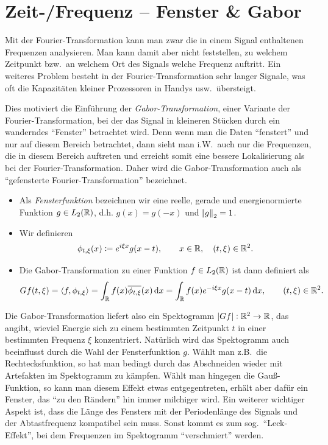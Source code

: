\section{Zeit-/Frequenz -- Fenster \& Gabor}

Mit der Fourier-Transformation kann man zwar die in einem Signal enthaltenen Frequenzen analysieren.
Man kann damit aber nicht feststellen, zu welchem Zeitpunkt bzw.\ an welchem Ort des Signals
welche Frequenz auftritt. Ein weiteres Problem besteht in der Fourier-Transformation sehr langer
Signale, was oft die Kapazitäten kleiner Prozessoren in Handys usw.\ übersteigt.

Dies motiviert die Einführung der \emph{Gabor-Transformation}, einer Variante der 
Fourier-Transformation, bei der das Signal in kleineren Stücken durch ein wanderndes 
\enquote{Fenster} betrachtet wird. Denn wenn man die Daten \enquote{fenstert} und nur auf diesem 
Bereich betrachtet, dann sieht man i.W.\ auch nur die Frequenzen, die in diesem Bereich auftreten
und erreicht somit eine bessere Lokalisierung als bei der Fourier-Transformation. Daher wird die 
Gabor-Transformation auch als \enquote{gefensterte Fourier-Transformation} bezeichnet.

\begin{definition}\leavevmode
\begin{itemize}
\item Als \emph{Fensterfunktion} bezeichnen wir eine reelle, gerade und energienormierte Funktion
  $ g \in L_{2}(\mathbb{R}) $, d.h. $ g(x) = g(-x) $ und $ \norm{g}_{2} = 1 $.
\item Wir definieren
  \[
    \phi_{t, \xi}(x) \coloneqq e^{i\xi x} g(x - t), \qquad x \in \mathbb{R}, \quad (t, \xi) \in \mathbb{R}^{2}.
  \]
\item Die Gabor-Transformation zu einer Funktion $ f \in L_{2}(\mathbb{R}) $ ist dann definiert als
  \[
      Gf(t,\xi)
    = \langle f, \phi_{t,\xi} \rangle
    = \int_{\R} f(x) \overline{\phi_{t, \xi}}(x) \dif x
    = \int_{\R} f(x) e^{-i \xi x} g(x - t) \dif x,
      \qquad (t, \xi) \in \R^{2}.
  \]
\end{itemize}
\end{definition}

\begin{remark}
Die Gabor-Transformation liefert also ein Spektogramm $ |Gf| : \mathbb{R}^{2} \rightarrow \mathbb{R} $, das angibt,
wieviel Energie sich zu einem bestimmten Zeitpunkt $ t $ in einer bestimmten Frequenz $ \xi $
konzentriert. Natürlich wird das Spektogramm auch beeinflusst durch die Wahl der Fensterfunktion
$ g $. Wählt man z.B.\ die Rechtecksfunktion, so hat man bedingt durch das Abschneiden wieder mit
Artefakten im Spektogramm zu kämpfen. Wählt man hingegen die Gauß-Funktion, so kann man diesem
Effekt etwas entgegentreten, erhält aber dafür ein Fenster, das \enquote{zu den Rändern} hin immer
milchiger wird. Ein weiterer wichtiger Aspekt ist, dass die Länge des Fensters mit der Periodenlänge
des Signals und der Abtastfrequenz kompatibel sein muss. Sonst kommt es zum sog.\ \enquote{Leck-
Effekt}, bei dem Frequenzen im Spektogramm \enquote{verschmiert} werden.
\end{remark}

